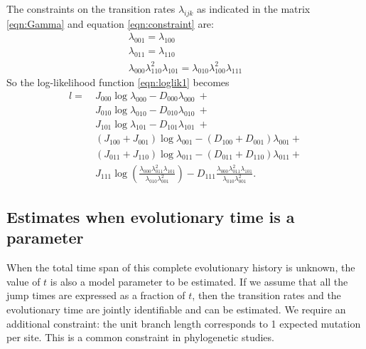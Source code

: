 \documentclass[11pt]{article}
\begin{document}
The constraints on the transition rates $\lambda_{ijk}$ as indicated in
the matrix \eqref{eqn:Gamma} and equation \eqref{eqn:constraint} are:
\begin{equation}\label{eqn:constraints}
  \begin{array}{c}
    \lambda_{001} = \lambda_{100}\\
    \lambda_{011} = \lambda_{110}\\
    \lambda_{000}\lambda_{110}^2\lambda_{101} = \lambda_{010}\lambda_{100}^2\lambda_{111}
  \end{array}
\end{equation}
So the log-likelihood function \eqref{eqn:loglik1} becomes
\begin{equation}\label{eqn:loglik2}
\begin{aligned}
l = ~ & J_{000}\log\lambda_{000} - D_{000}\lambda_{000} ~ + \\
    & J_{010}\log\lambda_{010} - D_{010}\lambda_{010} ~ + \\
    & J_{101}\log\lambda_{101} - D_{101}\lambda_{101} ~ + \\
    & (J_{100} + J_{001})\log\lambda_{001} - (D_{100}+D_{001})\lambda_{001} +  \\
    & (J_{011} + J_{110})\log\lambda_{011} - (D_{011}+D_{110})\lambda_{011} +  \\
    & J_{111}\log\left(\frac{\lambda_{000}\lambda_{011}^2\lambda_{101}}{\lambda_{010}\lambda_{001}^2}\right) - D_{111}\frac{\lambda_{000}\lambda_{011}^2\lambda_{101}}{\lambda_{010}\lambda_{001}^2}.
\end{aligned}
\end{equation}

\subsection{Estimates when evolutionary time is a parameter}

When the total time span of this complete evolutionary history is
unknown, the value of $t$ is also a model parameter to be
estimated. If we assume that all the jump times are expressed as a
fraction of $t$, then the transition rates and the evolutionary time
are jointly identifiable and can be estimated. We require an
additional constraint: the unit branch length corresponds to 1
expected mutation per site. This is a common constraint in
phylogenetic studies.
\end{document}
